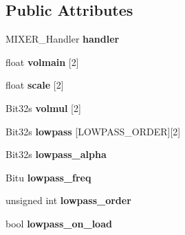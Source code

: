 \subsection*{Public Attributes}
\begin{DoxyCompactItemize}
\item 
\hypertarget{classMixerChannel_af892cf680b396c0e93a54e3da905ad04}{M\-I\-X\-E\-R\-\_\-\-Handler {\bfseries handler}}\label{classMixerChannel_af892cf680b396c0e93a54e3da905ad04}

\item 
\hypertarget{classMixerChannel_a5dd50a86b6a77a81a6e809ca0aa1e20b}{float {\bfseries volmain} \mbox{[}2\mbox{]}}\label{classMixerChannel_a5dd50a86b6a77a81a6e809ca0aa1e20b}

\item 
\hypertarget{classMixerChannel_a1c1e909ee91c622de6647b22f98a2e72}{float {\bfseries scale} \mbox{[}2\mbox{]}}\label{classMixerChannel_a1c1e909ee91c622de6647b22f98a2e72}

\item 
\hypertarget{classMixerChannel_a00091530e71a29cbde320013e15390cd}{Bit32s {\bfseries volmul} \mbox{[}2\mbox{]}}\label{classMixerChannel_a00091530e71a29cbde320013e15390cd}

\item 
\hypertarget{classMixerChannel_a53983eb8a65bfb327a2a13608d506093}{Bit32s {\bfseries lowpass} \mbox{[}L\-O\-W\-P\-A\-S\-S\-\_\-\-O\-R\-D\-E\-R\mbox{]}\mbox{[}2\mbox{]}}\label{classMixerChannel_a53983eb8a65bfb327a2a13608d506093}

\item 
\hypertarget{classMixerChannel_aec25b33e66a92276790fd5007bef05b8}{Bit32s {\bfseries lowpass\-\_\-alpha}}\label{classMixerChannel_aec25b33e66a92276790fd5007bef05b8}

\item 
\hypertarget{classMixerChannel_a5acf5f4237c343cceda3e4b168713bf2}{Bitu {\bfseries lowpass\-\_\-freq}}\label{classMixerChannel_a5acf5f4237c343cceda3e4b168713bf2}

\item 
\hypertarget{classMixerChannel_ad883c95fc5dee02d0e5f375cfb4f9d05}{unsigned int {\bfseries lowpass\-\_\-order}}\label{classMixerChannel_ad883c95fc5dee02d0e5f375cfb4f9d05}

\item 
\hypertarget{classMixerChannel_ac0b87191c55d5626b8287edff81011dd}{bool {\bfseries lowpass\-\_\-on\-\_\-load}}\label{classMixerChannel_ac0b87191c55d5626b8287edff81011dd}


\end{DoxyCompactItemize}
